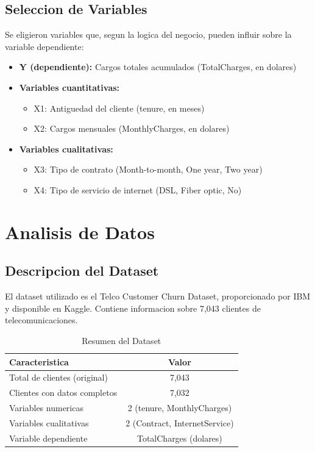 \documentclass[12pt,a4paper]{article}
\begin{document}
\subsection{Seleccion de Variables}

Se eligieron variables que, segun la logica del negocio, pueden influir sobre la variable dependiente:

\begin{itemize}[leftmargin=2cm]
    \item \textbf{Y (dependiente):} Cargos totales acumulados (TotalCharges, en dolares)
    \item \textbf{Variables cuantitativas:}
    \begin{itemize}
        \item X1: Antiguedad del cliente (tenure, en meses)
        \item X2: Cargos mensuales (MonthlyCharges, en dolares)
    \end{itemize}
    \item \textbf{Variables cualitativas:}
    \begin{itemize}
        \item X3: Tipo de contrato (Month-to-month, One year, Two year)
        \item X4: Tipo de servicio de internet (DSL, Fiber optic, No)
    \end{itemize}
\end{itemize}

\section{Analisis de Datos}

\subsection{Descripcion del Dataset}

El dataset utilizado es el Telco Customer Churn Dataset, proporcionado por IBM y disponible en Kaggle. Contiene informacion sobre 7,043 clientes de telecomunicaciones.

\begin{table}[H]
\centering
\caption{Resumen del Dataset}
\begin{tabular}{lc}
\toprule
\textbf{Caracteristica} & \textbf{Valor} \\
\midrule
Total de clientes (original) & 7,043 \\
Clientes con datos completos & 7,032 \\
Variables numericas & 2 (tenure, MonthlyCharges) \\
Variables cualitativas & 2 (Contract, InternetService) \\
Variable dependiente & TotalCharges (dolares) \\
\bottomrule
\end{tabular}
\end{table}
\end{document}
